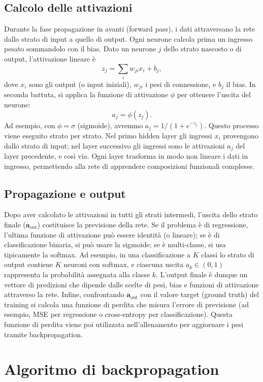 \documentclass[a4paper,12pt]{report}
\begin{document}
	\subsection{Calcolo delle attivazioni}
	Durante la fase propagazione in avanti (forward pass), i dati attraversano la rete dallo strato di input a quello di output. Ogni neurone calcola prima un ingresso pesato sommandolo con il bias. Dato un neurone $j$ dello strato nascosto o di output, l’attivazione lineare è
	\[
	z_j = \sum_i w_{ji} x_i + b_j,
	\]
	dove $x_i$ sono gli output (o input iniziali), $w_{ji}$ i pesi di connessione, e $b_j$ il bias. In seconda battuta, si applica la funzione di attivazione $\phi$ per ottenere l'uscita del neurone:
	\[
	a_j = \phi(z_j).
	\]
	Ad esempio, con $\phi=\sigma$ (sigmoide), avremmo $a_j=1/(1+e^{-z_j})$. Questo processo viene eseguito strato per strato. Nel primo hidden layer gli ingressi $x_i$ provengono dallo strato di input; nel layer successivo gli ingressi sono le attivazioni $a_j$ del layer precedente, e così via. Ogni layer trasforma in modo non lineare i dati in ingresso, permettendo alla rete di apprendere composizioni funzionali complesse.
	
	\subsection{Propagazione e output}
	Dopo aver calcolato le attivazioni in tutti gli strati intermedi, l'uscita dello strato finale ($\mathbf{a}_{\text{out}}$) costituisce la previsione della rete. Se il problema è di regressione, l'ultima funzione di attivazione può essere identità (o lineare); se è di classificazione binaria, si può usare la sigmoide; se è multi-classe, si usa tipicamente la softmax. Ad esempio, in una classificazione a $K$ classi lo strato di output contiene $K$ neuroni con softmax, e ciascuna uscita $a_k \in (0,1)$ rappresenta la probabilità assegnata alla classe $k$. L'output finale è dunque un vettore di predizioni che dipende dalle scelte di pesi, bias e funzioni di attivazione attraverso la rete. Infine, confrontando $\mathbf{a}_{\text{out}}$ con il valore target (ground truth) del training si calcola una funzione di perdita che misura l'errore di previsione (ad esempio, MSE per regressione o cross-entropy per classificazione). Questa funzione di perdita viene poi utilizzata nell'allenamento per aggiornare i pesi tramite backpropagation.
	
	\section{Algoritmo di backpropagation}
	
\end{document}

